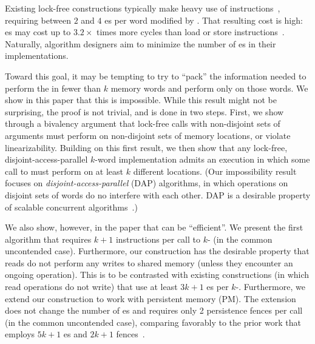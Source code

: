 Existing lock-free \mcas{} constructions typically make heavy use of \cas{} instructions~\cite{anderson95,harris02,moir97}, requiring between $2$ and $4$ \cas{}es per word modified by \mcas{}. That resulting cost is high: \cas{}es may cost up to $3.2\times$ times more cycles than load or store instructions~\cite{DavidGT13}. Naturally, algorithm designers aim to minimize the number of \cas{}es in their \mcas{} implementations. 

Toward this goal, it may be tempting to try to ``pack'' the information needed to perform the \mcas{} in fewer than $k$ memory words and perform \cas{} only on those words. 
We show in this paper that this is impossible. While this result might not be surprising, the proof is not trivial, and is done in two steps. First, we show through a bivalency argument that lock-free \mcas{} calls with non-disjoint sets of arguments must perform \cas{} on non-disjoint sets of memory locations, or violate linearizability. Building on this first result, we then show that any lock-free, disjoint-access-parallel $k$-word \mcas{} implementation admits an execution in which some call to \mcas{} must perform \cas{} on at least $k$ different locations. (Our impossibility result focuses on \textit{disjoint-access-parallel} (DAP) algorithms, in which \mcas{} operations on disjoint sets of words do no interfere with each other. DAP is a desirable property of scalable concurrent algorithms~\cite{israeli94}.) 

We also show, however, in the paper that \mcas{} can be ``efficient''. 
We present the first \mcas{} algorithm that requires $k+1$ \cas{} instructions per call to $k$-\cas{} (in the common uncontended case). Furthermore, our construction has the desirable property that reads do not perform any writes to shared memory (unless they encounter an ongoing \mcas{} operation). This is to be contrasted with existing \mcas{} constructions (in which read operations do not write) that use at least $3k+1$ \cas{}es per $k$-\cas{}. 
Furthermore, we extend our \mcas{} construction to work with persistent memory (PM). The extension does not change the number of \cas{}es and requires only 2 persistence fences per call (in the common uncontended case), comparing favorably to the prior work that employs $5k+1$ \cas{}es and $2k+1$ fences~\cite{wang18}.



